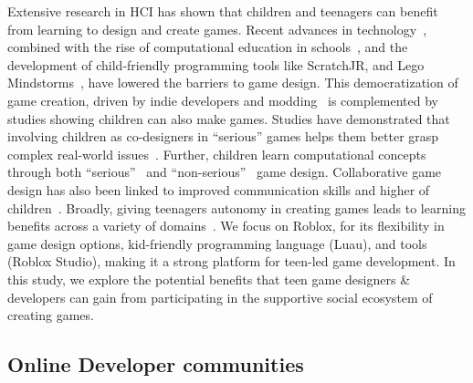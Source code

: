 Extensive research in HCI has shown that children and teenagers can benefit from learning to design and create games. Recent advances in technology~\cite{10.1145/3544548.3580976, 10.1145/2470654.2481360, 10.1145/3613904.3642895}, combined with the rise of computational education in schools~\cite{rijo2022computational, bers2022state}, and the development of child-friendly programming tools like ScratchJR, and Lego Mindstorms~\cite{flannery2013designing, kert2020effect}, have lowered the barriers to game design. This democratization of game creation, driven by indie developers and modding~\cite{10.1145/3375184, freeman2019exploring, sotamaa2010game} is complemented by studies showing children can also make games. Studies have demonstrated that involving children as co-designers in ``serious'' games helps them better grasp complex real-world issues~\cite{tucker2019broke}. Further, children learn computational concepts~\cite{10.1145/3544548.3581272, 10.1145/3025453.3025847, 10.1145/3311927.3323129} through both ``serious''~\cite{10.1145/3613905.3650833, kert2020effect} and ``non-serious''~\cite{troiano2019my} game design. Collaborative game design has also been linked to improved communication skills and higher  of children~\cite{denner2014pair, gritschacher2012standing}. %
Broadly, giving teenagers autonomy in creating games leads to learning benefits across a variety of domains~\cite{10.1145/3491102.3502124, gritschacher2012standing}. We focus on Roblox, for its flexibility in game design options, kid-friendly programming language (Luau), and tools (Roblox Studio), making it a strong platform for teen-led game development. In this study, we explore the potential benefits that teen game designers \& developers can gain from participating in the supportive social ecosystem of creating games.

\subsection{Online Developer communities}

